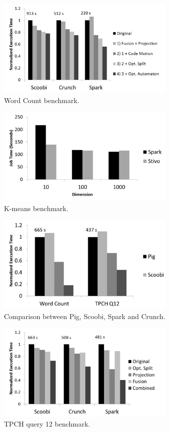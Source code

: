 
\begin{figure}[!hbt]
    \includegraphics[width=8.6cm]{figures/word-count}
   \caption{Word Count benchmark.}
   \label{fig:word-count}%
\end{figure}

\begin{figure}[!hbt]
    \includegraphics[width=8.6cm]{figures/k-means}
   \caption{K-means benchmark.}
   \label{fig:k-means}%
\end{figure}

\begin{figure}[!hbt]
    \includegraphics[width=8.6cm]{figures/pig}
   \caption{Comparison between Pig, Scoobi, Spark and Crunch.}
   \label{fig:pig}%
\end{figure}

\begin{figure}[!hbt]
    \includegraphics[width=8.6cm]{figures/tpch}

   \caption{TPCH query 12 benchmark.}
  \label{fig:tpch}%
\end{figure}

